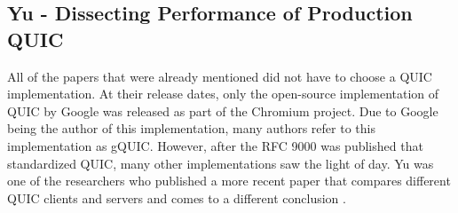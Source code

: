 \documentclass[conference]{IEEEtran}
\begin{document}





\subsection{Yu - Dissecting Performance of Production QUIC \cite{Yu2}}

All of the papers that were already mentioned did not have to choose a QUIC implementation. At their release dates, only the open-source implementation of QUIC by Google was released as part of the Chromium project. Due to Google being the author of this implementation, many authors refer to this implementation as gQUIC. However, after the RFC 9000 was published that standardized QUIC, many other implementations saw the light of day. Yu was one of the researchers who published a more recent paper that compares different QUIC clients and servers and comes to a different conclusion \cite{Yu2}. 
\end{document}
